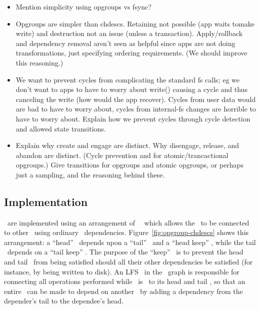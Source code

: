 \begin{itemize}
\item Mention simplicity using opgroups vs fsync?
\item Opgroups are simpler than chdescs. Retaining not possible (app
  waits tomake write) and destruction not an issue (unless a
  transaction). Apply/rollback and dependency removal aren't seen as
  helpful since apps are not doing transformations, just specifying
  ordering requirements. (We should improve this reasoning.)
\item We want to prevent cycles from complicating the standard fs
  calls; eg we don't want to apps to have to worry about write()
  causing a cycle and thus canceling the write (how would the app
  recover). Cycles from user data would are bad to have to worry
  about, cycles from internal-fs changes are horrible to have to
  worry about. Explain how we prevent cycles through cycle detection
  and allowed state transitions.
\item Explain why create and engage are distinct. Why disengage,
  release, and abandon are distinct. (Cycle prevention and for
  atomic/trancactional opgroups.) Give transitions for opgroups and
  atomic opgroups, or perhaps just a sampling, and the reasoning
  behind these.
\end{itemize}

\subsection{Implementation}
\label{sec:opgroup:implementation}


\Opgroups\ are implemented using an arrangement of \noop\ \chdescs\ which allows
the \opgroup\ to be connected to other \opgroups\ using ordinary \chdesc\
dependencies.  Figure~\ref{fig:opgroup-chdescs} shows this arrangement: a
``head'' \chdesc\ depends upon a ``tail'' \chdesc\ and a ``head keep'' \chdesc,
while the tail \chdesc\ depends on a ``tail keep'' \chdesc. The purpose of the
``keep'' \chdescs\ is to prevent the head and tail \chdescs\ from being
satisfied should all their other dependencies be satisfied (for instance, by
being written to disk). An LFS \module\ in the \module\ graph is responsible for
connecting all operations performed while \anopgroup\ is \engaged\ to its head
and tail \chdescs, so that an entire \opgroup\ can be made to depend on another
\opgroup\ by adding a dependency from the depender's tail to the dependee's
head.


